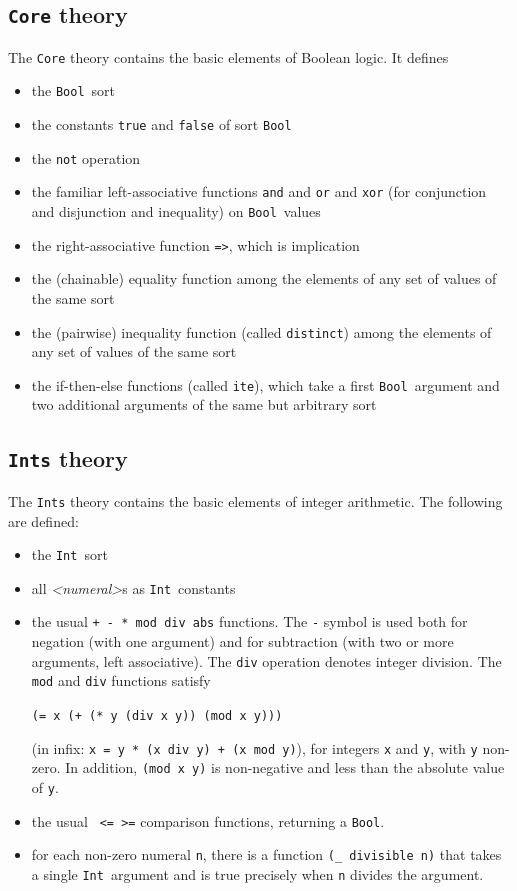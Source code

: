 \documentclass[12pt,oneside]{report}
\newcommand{\numeral}{{\it <numeral>}}
\newcommand{\Bool}{{\tt Bool}}
\newcommand{\Int}{{\tt Int}}
\newcommand{\nospace}{\setlength{\itemsep}{0in}\setlength{\parsep}{0in}\setlength{\parskip}{0in}\setlength{\topsep}{0in}}
\begin{document}
\subsection{{\tt Core} theory}
The {\tt Core} theory contains the basic elements of Boolean logic.  It defines
\begin{itemize} \nospace
\item the \Bool~sort
\item the constants {\tt true} and {\tt false} of sort \Bool
\item the {\tt not} operation
\item the familiar left-associative functions {\tt and} and {\tt or} and {\tt xor} (for conjunction and disjunction and inequality) on \Bool~values
\item the right-associative function {\tt =>}, which is implication
\item the (chainable) equality function among the elements of any set of values of the same sort
\item the (pairwise) inequality function (called {\tt distinct}) among the elements of any set of values of the same sort
\item the if-then-else functions (called {\tt ite}), which take a first \Bool~argument and two additional arguments of the same but arbitrary sort
\end{itemize}

\subsection{{\tt Ints} theory}
The {\tt Ints} theory contains the basic elements of integer arithmetic.  The following are defined:
\begin{itemize} \nospace
\item the \Int\ sort
\item all \numeral s as \Int~constants
\item the usual {\tt + - * mod div abs} functions. The {\tt -} symbol is used both for negation (with one argument)
and for subtraction (with two or more arguments, left associative).  The {\tt div} operation denotes integer division.
The {\tt mod} and {\tt div} functions satisfy\\
\centerline{\tt (= x (+ (* y (div x y)) (mod x y)))}
 (in infix: {\tt x = y * (x div y) + (x mod y)}),
for integers {\tt x} and {\tt y}, with {\tt y} non-zero.
In addition, {\tt (mod x y)} is non-negative and less than the absolute value of {\tt y}.
\item the usual {\tt < > <= >=} comparison functions, returning a \Bool.
\item for each non-zero numeral {\tt n}, there is a function {\tt (\_ divisible n)} that takes a single \Int~argument and is true
precisely when {\tt n} divides the argument.
\end{itemize}
\end{document}
